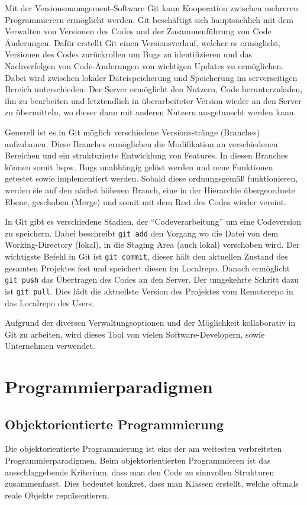 \documentclass[]{dsadokumentation}
\begin{document}
Mit der Versionsmanagement-Software Git kann Kooperation zwischen mehreren Programmierern ermöglicht werden. Git beschäftigt sich hauptsächlich mit dem Verwalten von Versionen des Codes und der Zusammenführung von Code Änderungen. Dafür erstellt Git einen Versionsverlauf, welcher es ermöglicht, Versionen des Codes zurückrollen um Bugs zu identifizieren und das Nachverfolgen von Code-Änderungen von wichtigen Updates zu ermöglichen. Dabei wird zwischen lokaler Dateispeicherung und Speicherung im serverseitigen Bereich unterschieden. Der Server ermöglicht den Nutzern, Code herunterzuladen, ihn zu bearbeiten und letztendlich in überarbeiteter Version wieder an den Server zu übermitteln, wo dieser dann mit anderen Nutzern ausgetauscht werden kann.

Generell ist es in Git möglich verschiedene Versionsstränge (Branches) aufzubauen. Diese Branches ermöglichen die Modifikation an verschiedenen Bereichen und ein strukturierte Entwicklung von Features. In diesen Branches können somit bspw. Bugs unabhängig gelöst werden und neue Funktionen getestet sowie implementiert werden. Sobald diese ordnungsgemäß funktionieren, werden sie auf den nächst höheren Branch, eine in der Hierarchie übergeordnete Ebene, geschoben (Merge) und somit mit dem Rest des Codes wieder vereint.

In Git gibt es verschiedene Stadien, der \enquote{Codeverarbeitung} um eine Codeversion zu speichern. Dabei beschreibt \verb|git add| den Vorgang wo die Datei von dem Working-Directory (lokal), in die Staging Area (auch lokal) verschoben wird. Der wichtigste Befehl in Git ist \verb|git commit|, dieser hält den aktuellen Zustand des gesamten Projektes fest und speichert diesen im Localrepo. Danach ermöglicht \verb|git push| das Übertragen des Codes an den Server. Der umgekehrte Schritt dazu ist \verb|git pull|. Dies lädt die aktuellste Version des Projektes vom Remoterepo in das Localrepo des Users.

Aufgrund der diversen Verwaltungsoptionen und der Möglichkeit kollaborativ in Git zu arbeiten, wird dieses Tool von vielen Software-Developern, sowie Unternehmen verwendet.

\section{Programmierparadigmen}
\subsection{Objektorientierte Programmierung}
Die objektorientierte Programmierung ist eins der am weitesten verbreiteten Programmierparadigmen. Beim objektorientierten Programmieren ist das ausschlaggebende Kriterium, dass man den Code zu sinnvollen Strukturen zusammenfasst. Dies bedeutet konkret, dass man Klassen erstellt, welche oftmals reale Objekte repräsentieren.
\end{document}
